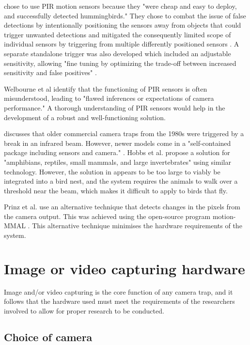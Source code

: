 \documentclass[class=report,11pt,crop=false]{standalone}
\begin{document}
\cite{rico-guevara2017bring} chose to use PIR motion sensors because they "were cheap and easy to deploy, and successfully detected hummingbirds." They chose to combat the issue of false detections by intentionally positioning the sensors away from objects that could trigger unwanted detections and mitigated the consequently limited scope of individual sensors by triggering from multiple differently positioned sensors \cite{rico-guevara2017bring}. A separate standalone trigger was also developed which included an adjustable sensitivity, allowing "fine tuning by optimizing the trade-off between increased sensitivity and false positives" \cite{rico-guevara2017bring}.

Welbourne et al identify that the functioning of PIR sensors is often misunderstood, leading to "flawed inferences or expectations of camera performance." \cite{welbourne2016how} A thorough understanding of PIR sensors would help in the development of a robust and well-functioning solution.

\cite{rovero2013which} discusses that older commercial camera traps from the 1980s were triggered by a break in an infrared beam. However, newer models come in a "self-contained package including sensors and camera." \cite{rovero2013which}. Hobbs et al. propose a solution for "amphibians, reptiles, small mammals, and large invertebrates" \cite{hobbs2017an} using similar technology. However, the solution in \cite{hobbs2017an} appears to be too large to viably be integrated into a bird nest, and the system requires the animals to walk over a threshold near the beam, which makes it difficult to apply to birds that fly.

Prinz et al. \cite{prinz2016a} use an alternative technique that detects changes in the pixels from the camera output. This was achieved using the open-source program motion-MMAL \cite{prinz2016a}. This alternative technique minimises the hardware requirements of the system.


\section{Image or video capturing hardware}

Image and/or video capturing is the core function of any camera trap, and it follows that the hardware used must meet the requirements of the researchers involved to allow for proper research to be conducted.

\subsection{Choice of camera}
\end{document}
